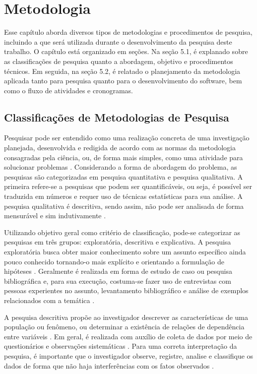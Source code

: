 \chapter[Metodologia]{Metodologia}

Esse capítulo aborda diversos tipos de metodologias e procedimentos de pesquisa, incluindo a que será utilizada durante o desenvolvimento da pesquisa deste trabalho. O capítulo está organizado em seções. Na seção 5.1, é explanado sobre as classificações de pesquisa quanto a abordagem, objetivo e procedimentos técnicos. Em seguida, na seção 5.2, é relatado o planejamento da metodologia aplicada tanto para pesquisa quanto para o desenvolvimento do software, bem como o fluxo de atividades e cronogramas.

 \section{Classificações de Metodologias de Pesquisa}
  
Pesquisar pode ser entendido como uma realização concreta de uma investigação planejada, desenvolvida e redigida de acordo com as normas da metodologia consagradas pela ciência, ou, de forma mais simples, como uma atividade para solucionar problemas \cite{kauark2010} \cite{ruiz1996}. Considerando a forma de abordagem do problema, as pesquisas são categorizadas em pesquisa quantitativa e pesquisa qualitativa. A primeira refere-se a pesquisas que podem ser quantificáveis, ou seja, é possível ser traduzida em números e requer uso de técnicas estatísticas para sua análise. A pesquisa qualitativa é descritiva, sendo assim, não pode ser analisada de forma mensurável e sim indutivamente \cite{kauark2010}.

 \par
  \indent Utilizando objetivo geral como critério de classificação, pode-se categorizar as pesquisas em três grupos: exploratória, descritiva e explicativa. A pesquisa exploratória busca obter maior conhecimento sobre um assunto específico ainda pouco conhecido tornando-o mais explícito e orientando a formulação de hipóteses \cite{gil2002}. Geralmente é realizada em forma de estudo de caso ou pesquisa bibliográfica \cite{rodrigues2007} e, para sua execução, costuma-se fazer uso de entrevistas com pessoas experientes no assunto, levantamento bibliográfico e análise de exemplos relacionados com a temática \cite{gil2002}. 

 \par
  \indent A pesquisa descritiva propõe ao investigador descrever as características de uma população ou fenômeno, ou determinar a existência de relações de dependência entre variáveis \cite{gil2002}.  Em geral, é realizada com auxílio de coleta de dados por meio de questionários e observações sistemáticas \cite{tafner2007}. Para uma correta interpretação da pesquisa, é importante que o investigador observe, registre, analise e classifique os dados de forma que não haja interferências com os fatos observados \cite{rodrigues2007}. 


